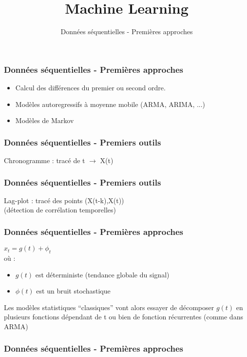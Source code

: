 \documentclass{formation}
\title{Machine Learning}
\subtitle{Données séquentielles - Premières approches }
\begin{document}
\maketitle

\begin{frame}
  \frametitle{Données séquentielles - Premières approches }
  \begin{itemize}
  \item Calcul des différences du premier ou second ordre.
  \item Modèles autoregressifs à moyenne mobile (ARMA, ARIMA, ...)
  \item Modèles de Markov 
  \end{itemize}
\end{frame}

\begin{frame}
  \frametitle{Données séquentielles - Premiers outils}
  Chronogramme : tracé de t $\rightarrow$ X(t) 
\end{frame}

\begin{frame}
  \frametitle{Données séquentielles - Premiers outils}
  Lag-plot : tracé des points (X(t-k),X(t)) \\
  (détection de corrélation temporelles)
  \begin{minipage}[l]{0.499\linewidth}
  \end{minipage}\hfill
  \begin{minipage}[l]{0.499\linewidth}
  \end{minipage}\hfill
\end{frame}

\begin{frame}
  \frametitle{Données séquentielles - Premières approches }
  $x_t=g(t)+\phi_t$ \\
  où :
  \begin{itemize}
  \item $g(t)$ est déterministe (tendance globale du signal)
  \item $\phi(t)$ est un bruit stochastique
  \end{itemize}
  Les modèles statistiques ``classiques'' vont alors essayer de décomposer $g(t)$ en plusieurs fonctions dépendant de t ou bien de fonction récurrentes (comme dans ARMA)
\end{frame}

\begin{frame}
  \frametitle{Données séquentielles - Premières approches }
\end{frame}
\end{document}
